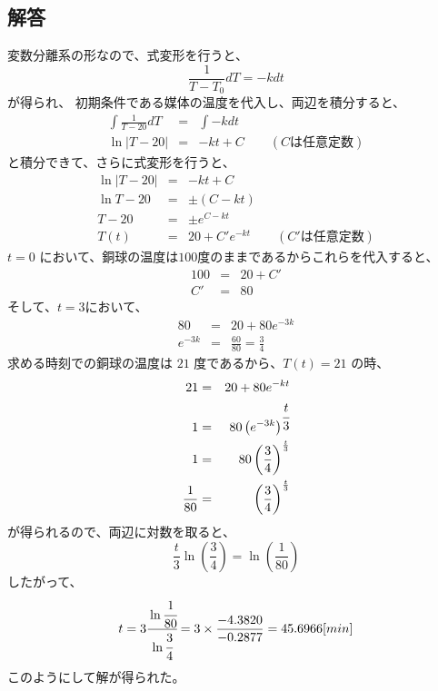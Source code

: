 \documentclass[dvipdfmx,uplatex]{jsarticle}
\begin{document}
\begin{spacing}{1.6}
\begin{qparts}
  \subsection*{解答}
  変数分離系の形なので、式変形を行うと、
  \begin{equation*}
    \frac{1}{T - T_0}dT = -kdt
  \end{equation*}
  が得られ、  初期条件である媒体の温度を代入し、両辺を積分すると、
  \begin{eqnarray*}
        \int \frac{1}{T - 20}dT & = & \int -kdt \\
        \ln |T - 20| & = & -kt + C \qquad (Cは任意定数)
  \end{eqnarray*}
  と積分できて、さらに式変形を行うと、\\
  \begin{eqnarray*}
        \ln |T - 20| & = & -kt + C \\
        \ln T - 20 & = & \pm (C - kt) \\
        T - 20 & = & \pm e ^ {C - kt} \\
        T(t) & = & 20 + C'e ^ {-kt} \qquad (C'は任意定数)
  \end{eqnarray*}
  $ t = 0 $ において、銅球の温度は$100$度のままであるからこれらを代入すると、
  \begin{eqnarray*}
    100 & = & 20 + C' \\
    C' & = & 80
  \end{eqnarray*}
  そして、$ t = 3 $において、
  \begin{eqnarray*}
    80 & = & 20 + 80 e ^ {-3k} \\
    e ^ {-3k} & = & \frac{60}{80} = \frac{3}{4}
  \end{eqnarray*}
  求める時刻での銅球の温度は $ 21 $ 度であるから、$ T(t) = 21 $ の時、
  \begin{eqnarray*}
    21 & = & 20 + 80e ^ {-kt}\\
    1 & = & 80 \left(e ^ {-3k} \right) ^ { \cfrac{t}{3}} \\
    1 & = & 80 \left( \frac{3}{4} \right) ^ {\frac{t}{3}} \\
    \frac{1}{80} & = & \left( \frac{3}{4} \right) ^ {\frac{t}{3}}
  \end{eqnarray*}
  が得られるので、両辺に対数を取ると、
  \begin{equation*}
    \frac{t}{3} \ln \left(\frac{3}{4}\right) = \ln \left(\frac{1}{80}\right)
  \end{equation*}
  したがって、
  \begin{equation*}
    t = 3 \cfrac{\ln \cfrac{1}{80}}{\ln \cfrac{3}{4}} = 3 \times \frac{-4.3820}{-0.2877} = 45.6966[min]
  \end{equation*}
  このようにして解が得られた。


\end{qparts}
\end{spacing}
\end{document}
